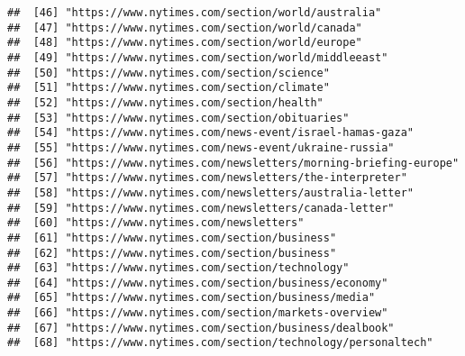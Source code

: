 \documentclass[
]{article}
\begin{document}
\begin{verbatim}
##  [46] "https://www.nytimes.com/section/world/australia"                                                           
##  [47] "https://www.nytimes.com/section/world/canada"                                                              
##  [48] "https://www.nytimes.com/section/world/europe"                                                              
##  [49] "https://www.nytimes.com/section/world/middleeast"                                                          
##  [50] "https://www.nytimes.com/section/science"                                                                   
##  [51] "https://www.nytimes.com/section/climate"                                                                   
##  [52] "https://www.nytimes.com/section/health"                                                                    
##  [53] "https://www.nytimes.com/section/obituaries"                                                                
##  [54] "https://www.nytimes.com/news-event/israel-hamas-gaza"                                                      
##  [55] "https://www.nytimes.com/news-event/ukraine-russia"                                                         
##  [56] "https://www.nytimes.com/newsletters/morning-briefing-europe"                                               
##  [57] "https://www.nytimes.com/newsletters/the-interpreter"                                                       
##  [58] "https://www.nytimes.com/newsletters/australia-letter"                                                      
##  [59] "https://www.nytimes.com/newsletters/canada-letter"                                                         
##  [60] "https://www.nytimes.com/newsletters"                                                                       
##  [61] "https://www.nytimes.com/section/business"                                                                  
##  [62] "https://www.nytimes.com/section/business"                                                                  
##  [63] "https://www.nytimes.com/section/technology"                                                                
##  [64] "https://www.nytimes.com/section/business/economy"                                                          
##  [65] "https://www.nytimes.com/section/business/media"                                                            
##  [66] "https://www.nytimes.com/section/markets-overview"                                                          
##  [67] "https://www.nytimes.com/section/business/dealbook"                                                         
##  [68] "https://www.nytimes.com/section/technology/personaltech"                                                   

\end{verbatim}
\end{document}
